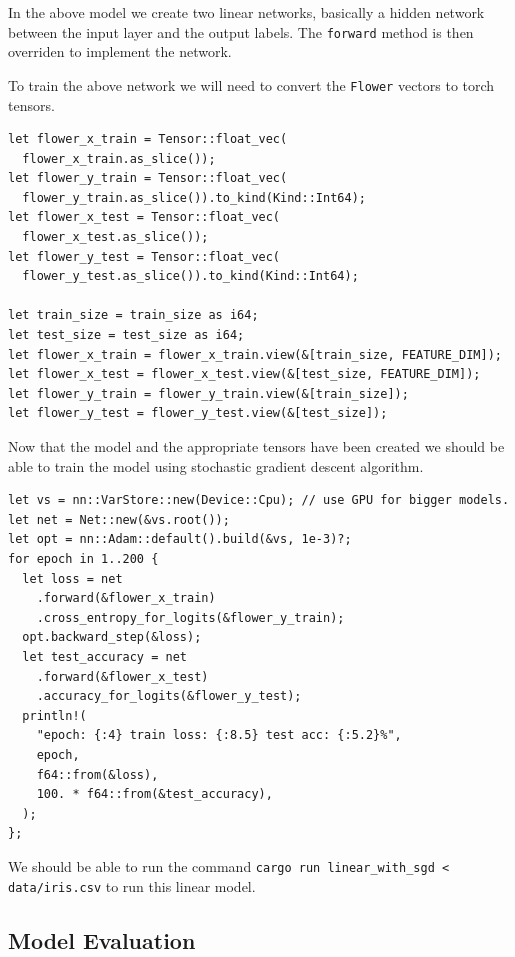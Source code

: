 \documentclass{book}
\begin{document}
In the above model we create two linear networks, basically a hidden network between the input layer and the output labels. The \lstinline{forward} method is then overriden to implement the network.

To train the above network we will need to convert the \lstinline{Flower} vectors to torch tensors.

\begin{lstlisting}[caption={}]
let flower_x_train = Tensor::float_vec(
  flower_x_train.as_slice());
let flower_y_train = Tensor::float_vec(
  flower_y_train.as_slice()).to_kind(Kind::Int64);
let flower_x_test = Tensor::float_vec(
  flower_x_test.as_slice());
let flower_y_test = Tensor::float_vec(
  flower_y_test.as_slice()).to_kind(Kind::Int64);

let train_size = train_size as i64;
let test_size = test_size as i64;
let flower_x_train = flower_x_train.view(&[train_size, FEATURE_DIM]);
let flower_x_test = flower_x_test.view(&[test_size, FEATURE_DIM]);
let flower_y_train = flower_y_train.view(&[train_size]);
let flower_y_test = flower_y_test.view(&[test_size]);
\end{lstlisting}

Now that the model and the appropriate tensors have been created we should be able to train the model using stochastic gradient descent algorithm.

\begin{lstlisting}[caption={}]
let vs = nn::VarStore::new(Device::Cpu); // use GPU for bigger models.
let net = Net::new(&vs.root());
let opt = nn::Adam::default().build(&vs, 1e-3)?;
for epoch in 1..200 {
  let loss = net
    .forward(&flower_x_train)
    .cross_entropy_for_logits(&flower_y_train);
  opt.backward_step(&loss);
  let test_accuracy = net
    .forward(&flower_x_test)
    .accuracy_for_logits(&flower_y_test);
  println!(
    "epoch: {:4} train loss: {:8.5} test acc: {:5.2}%",
    epoch,
    f64::from(&loss),
    100. * f64::from(&test_accuracy),
  );
};
\end{lstlisting}

We should be able to run the command \lstinline{cargo run linear_with_sgd < data/iris.csv} to run this linear model.

\label{par:linear_network_using_torch}

\label{sub:neural_networks}

\subsection{Model Evaluation}%
\end{document}
